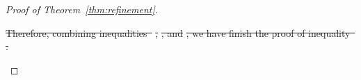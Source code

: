 \documentclass[lettersize,onecolumn,journal]{IEEEtran}
\theoremstyle{definition}
\theoremstyle{definition}
\providecommand{\DIFdeltex}[1]{{\protect\color{red}\sout{#1}}}                      %
\providecommand{\DIFdel}[1]{\texorpdfstring{\DIFdeltex{#1}}{}} %
\begin{document}
\begin{proof}[Proof of Theorem~\ref{thm:refinement}]
\begin{enumerate}

\DIFdel{Therefore, combining inequalities~}%
\DIFdel{, }%
\DIFdel{, and }%
\DIFdel{, we have finish the proof of inequality~}%
\DIFdel{.
}%


\end{enumerate}%



\end{proof}
\end{document}
